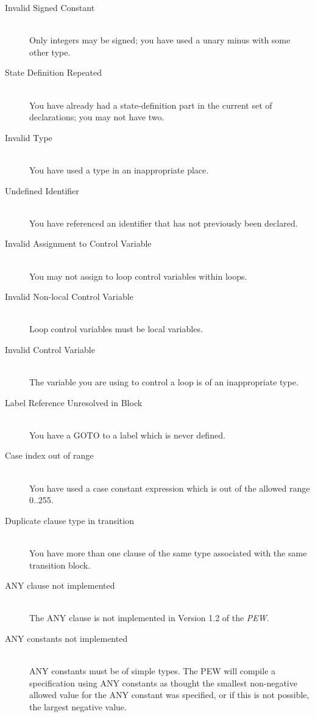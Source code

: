 \begin{description}
\item[Invalid Signed Constant]\mbox{}\\
Only integers may be signed; you have used a unary minus with some
other type.

\item[State Definition Repeated]\mbox{}\\
You have already had a state-definition part in the current set of
declarations; you may not have two.

\item[Invalid Type]\mbox{}\\
You have used a type in an inappropriate place.

\item[Undefined Identifier]\mbox{}\\
You have referenced an identifier that has not previously been
declared.

\item[Invalid Assignment to Control Variable]\mbox{}\\
You may not assign to loop control variables within loops.

\item[Invalid Non-local Control Variable]\mbox{}\\
Loop control variables must be local variables.

\item[Invalid Control Variable]\mbox{}\\
The variable you are using to control a loop is of an inappropriate
type.

\item[Label Reference Unresolved in Block]\mbox{}\\
You have a GOTO to a label which is never defined.

\item[Case index out of range]\mbox{}\\
You have used a case constant expression which is out of the
allowed range 0..255.

\item[Duplicate clause type in transition]\mbox{}\\
You have more than one clause of the same type associated
with the same transition block.

\item[ANY clause not implemented]\mbox{}\\
The ANY clause is not implemented in Version 1.2 of the {\em PEW}.

\item[ANY constants not implemented]\mbox{}\\
ANY constants must be of simple types. The PEW will compile a 
specification using ANY constants as thought the smallest
non-negative allowed value for the ANY constant was specified,
or if this is not possible, the largest negative value.


\end{description}
